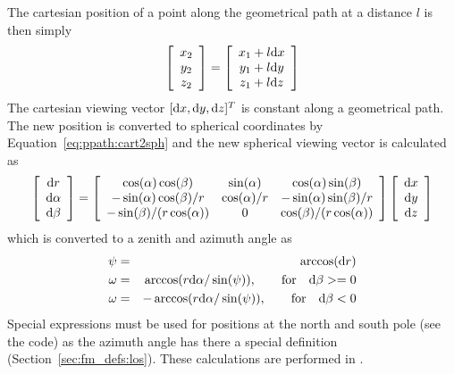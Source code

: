 The cartesian position of a point along the geometrical path at a
distance $l$ is then simply
\begin{equation}
 \left[ \begin{array}{c}
  x_2 \\
  y_2 \\
  z_2
 \end{array} \right] =
 \left[ \begin{array}{c}
  x_1 + l\mathrm{d} x \\
  y_1 + l\mathrm{d} y \\
  z_1 + l\mathrm{d} z
 \end{array} \right]
  \label{eq:ppath:xdl}
\end{equation}
The cartesian viewing vector $[\mathrm{d} x, \mathrm{d} y, \mathrm{d} z]^T$ is
constant along a geometrical path. The new position is converted to
spherical coordinates by Equation~\ref{eq:ppath:cart2sph} and the new
spherical viewing vector is calculated as
\begin{equation}
 \left[ \begin{array}{c}
  \mathrm{d} r \\
  \mathrm{d} \alpha \\
  \mathrm{d} \beta
 \end{array} \right] =
 \left[ \begin{array}{ccc}
  \cos(\alpha)\cos(\beta) & \sin(\alpha)            & \cos(\alpha)\sin(\beta) \\ 
  -\sin(\alpha)\cos(\beta)/r & \cos(\alpha)/r & -\sin(\alpha)\sin(\beta)/r \\ 
  -\sin(\beta)/(r\cos(\alpha)) & 0             & \cos(\beta)/(r\cos(\alpha)) 
 \end{array} \right] 
 \left[ \begin{array}{c}
  \mathrm{d} x \\
  \mathrm{d} y \\
  \mathrm{d} z
 \end{array} \right]
 \label{eq:ppath:los2sph}
\end{equation}
which is converted to a zenith and azimuth angle as
\begin{eqnarray}
  \psi &=& \arccos(\mathrm{d} r) \nonumber  \\
  \omega &=& \arccos(r\mathrm{d}\alpha/\sin(\psi)), 
                      \qquad \textrm{for} \quad \mathrm{d}\beta >= 0 \\
  \omega &=& -\arccos(r\mathrm{d}\alpha/\sin(\psi)), 
                      \qquad \textrm{for} \quad \mathrm{d}\beta < 0  \nonumber
 \label{eq:ppath:conv2zaaa}
\end{eqnarray}
Special expressions must be used for positions at the north and south
pole (see the code) as the azimuth angle has there a special
definition (Section~\ref{sec:fm_defs:los}). These calculations are performed in
.

